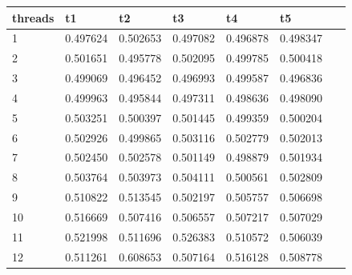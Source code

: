 \documentclass[a4paper,11pt, twoside]{report}
\begin{document}
\begin{table}[!ht]
    \centering
    \begin{tabular}{|l|l|l|l|l|l|l|}
    \hline
        threads & t1 & t2 & t3 & t4 & t5 & ~ \\ \hline
        1 & 0.497624 & 0.502653 & 0.497082 & 0.496878 & 0.498347 & ~ \\ \hline
        2 & 0.501651 & 0.495778 & 0.502095 & 0.499785 & 0.500418 & ~ \\ \hline
        3 & 0.499069 & 0.496452 & 0.496993 & 0.499587 & 0.496836 & ~ \\ \hline
        4 & 0.499963 & 0.495844 & 0.497311 & 0.498636 & 0.498090 & ~ \\ \hline
        5 & 0.503251 & 0.500397 & 0.501445 & 0.499359 & 0.500204 & ~ \\ \hline
        6 & 0.502926 & 0.499865 & 0.503116 & 0.502779 & 0.502013 & ~ \\ \hline
        7 & 0.502450 & 0.502578 & 0.501149 & 0.498879 & 0.501934 & ~ \\ \hline
        8 & 0.503764 & 0.503973 & 0.504111 & 0.500561 & 0.502809 & ~ \\ \hline
        9 & 0.510822 & 0.513545 & 0.502197 & 0.505757 & 0.506698 & ~ \\ \hline
        10 & 0.516669 & 0.507416 & 0.506557 & 0.507217 & 0.507029 & ~ \\ \hline
        11 & 0.521998 & 0.511696 & 0.526383 & 0.510572 & 0.506039 & ~ \\ \hline
        12 & 0.511261 & 0.608653 & 0.507164 & 0.516128 & 0.508778 & ~ \\ \hline
    \end{tabular}
\end{table}
\end{document}
